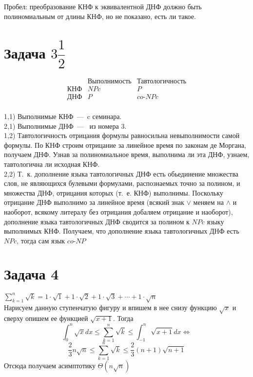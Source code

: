 \documentclass[a4paper,12pt]{article} %
\begin{document}
Пробел: преобразование КНФ к эквивалентной ДНФ должно быть полиномиальным от длины КНФ, но не показано, есть ли такое.\\
 
 \section*{Задача $3\dfrac{1}{2}$}
\[\begin{matrix}
\hspace{20pt} & \text{Выполнимость} & \text{Тавтологичность}\\
\text{КНФ}& NPc & P\\
\text{ДНФ}& P & co\text{-}NPc
\end{matrix}
\]\\
1,1) Выполнимые КНФ~---~c семинара. \\
2,1) Выполнимые ДНФ~---~ из номера $3$. \\
1,2) Тавтологичность отрицания формулы равносильна невыполнимости самой формулы. По КНФ строим отрицание за линейное время по законам де Моргана, получаем ДНФ. Узнав за полиномиальное время, выполнима ли эта ДНФ, узнаем, тавтологична ли исходная КНФ.\\
2,2) Т.~к. дополнение языка тавтологичных ДНФ есть обьединение множества слов, не являющихся булевыми формулами, распознаемых точно за полином, и множества ДНФ, отрицания которых (т.~е. КНФ) выполнимы. Поскольку отрицание ДНФ выполнимо за линейное время (всякий знак $\vee$ меняем на $\wedge$ и наоборот, всякому литералу без отрицания добаляем отрицание и наоборот), дополнение языка тавтологичных ДНФ сводится за полином к $NPc$ языку выполнимых КНФ. Получаем, что дополнение языка тавтологичных ДНФ есть $NPc$, тогда сам язык $co\text{-}NP$\\

\section*{Задача 4}
$
\sum_{k=1}^{n}{\sqrt{k}} = 1 \cdot \sqrt{1} + 1 \cdot \sqrt{2} + 1 \cdot \sqrt{3} + \cdots + 1 \cdot \sqrt{n}
$\\

\noindent Нарисуем данную ступенчатую фигуру и впишем в нее снизу функцию $\sqrt{x}$ и сверху опишем ее функцией $\sqrt{x+1}$. Тогда\\
\[
\int_{0}^{n}{\sqrt{x}dx} \leq \sum_{k=1}^{n}{\sqrt{k}}
\leq\int_{-1}^{n}{\sqrt{x+1}dx}\Leftrightarrow
\]
\[
\dfrac{2}{3}n\sqrt{n}\leq \sum_{k=1}^{n}{\sqrt{k}} \leq\dfrac{2}{3}(n+1)\sqrt{n+1} 
\]
Отсюда получаем асимптотику $\Theta(n\sqrt{n})$\\
\end{document}
